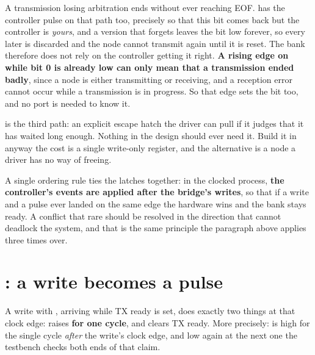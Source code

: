 \begin{aside}
A transmission losing arbitration ends without ever reaching EOF.  has the controller
pulse  on that path too, precisely so that this bit comes back \textemdash{} but the
controller is \emph{yours}, and a version that forgets leaves the bit low forever, so every later
 is discarded and the node cannot transmit again until it is reset. The bank therefore
does not rely on the controller getting it right. \textbf{A rising edge on  while bit 0 is
already low can only mean that a transmission ended badly}, since a node is either transmitting or
receiving, and a reception error cannot occur while a transmission is in progress. So that edge sets
the bit too, and no  port is needed to know it.

 is the third path: an explicit escape hatch the driver can pull if it judges that it
has waited long enough. Nothing in the design should ever need it. Build it in anyway \textemdash{}
the cost is a single write-only register, and the alternative is a node a driver has no way of
freeing.
\end{aside}

A single ordering rule ties the latches together: in the clocked process, \textbf{the controller's
events are applied after the bridge's writes}, so that if a  write and a
 pulse ever landed on the same edge the hardware wins and the bank stays ready. A
conflict that rare should be resolved in the direction that cannot deadlock the system, and that is
the same principle the paragraph above applies three times over.

\section{: a write becomes a pulse}
\label{c18:sec:txsend}

A  write with , arriving while TX ready is set, does exactly
two things at that clock edge: raises  \textbf{for one cycle}, and clears TX ready. More
precisely:  is high for the single cycle \emph{after} the write's clock edge, and low
again at the next one \textemdash{} the testbench checks both ends of that claim.

